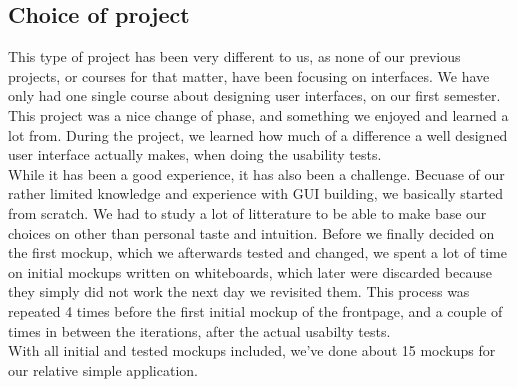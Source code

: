\subsection{Choice of project}
This type of project has been very different to us, as none of our previous projects, or courses for that matter, have been focusing on interfaces. We have only had one single course about designing user interfaces, on our first semester. \\
This project was a nice change of phase, and something we enjoyed and learned a lot from. During the project, we learned how much of a difference a well designed user interface actually makes, when doing the usability tests.\\
While it has been a good experience, it has also been a challenge. Becuase of our rather limited knowledge and experience with GUI building, we basically started from scratch. We had to study a lot of litterature to be able to make base our choices on other than personal taste and intuition. Before we finally decided on the first mockup, which we afterwards tested and changed, we spent a lot of time on initial mockups written on whiteboards, which later were discarded because they simply did not work the next day we revisited them. This process was repeated 4 times before the first initial mockup of the frontpage, and a couple of times in between the iterations, after the actual usabilty tests.\\ With all initial and tested mockups included, we've done about 15 mockups for our relative simple application.